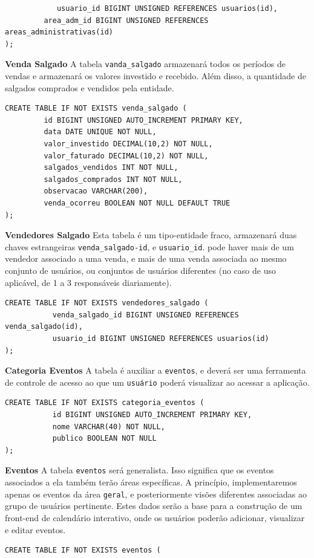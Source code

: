 \documentclass[11pt]{article}
\begin{document}
\begin{enumerate}
\begin{enumerate}
\begin{verbatim}
            usuario_id BIGINT UNSIGNED REFERENCES usuarios(id),
         area_adm_id BIGINT UNSIGNED REFERENCES areas_administrativas(id)
);
\end{verbatim}
\textbf{Venda Salgado}
A tabela \texttt{vanda\_salgado} armazenará todos os períodos de vendas e armazenará os valores investido e recebido. Além disso, a quantidade de salgados comprados e vendidos pela entidade.
\begin{verbatim}
CREATE TABLE IF NOT EXISTS venda_salgado (
         id BIGINT UNSIGNED AUTO_INCREMENT PRIMARY KEY,
         data DATE UNIQUE NOT NULL,
         valor_investido DECIMAL(10,2) NOT NULL,
         valor_faturado DECIMAL(10,2) NOT NULL,
         salgados_vendidos INT NOT NULL,
         salgados_comprados INT NOT NULL,
         observacao VARCHAR(200),
         venda_ocorreu BOOLEAN NOT NULL DEFAULT TRUE
);
\end{verbatim}
\textbf{Vendedores Salgado}
Esta tabela é um tipo-entidade fraco, armazenará duas chaves estrangeiras \texttt{venda\_salgado-id}, e \texttt{usuario\_id}. pode haver mais de um vendedor associado a uma venda, e mais de uma venda associada ao mesmo conjunto de usuários, ou conjuntos de usuários diferentes (no caso de uso aplicável, de 1 a 3 responsáveis diariamente).
\begin{verbatim}
CREATE TABLE IF NOT EXISTS vendedores_salgado (
           venda_salgado_id BIGINT UNSIGNED REFERENCES venda_salgado(id),
           usuario_id BIGINT UNSIGNED REFERENCES usuarios(id)
);
\end{verbatim}
\textbf{Categoria Eventos}
A tabela é auxiliar a \texttt{eventos}, e deverá ser uma ferramenta de controle de acesso ao que um \texttt{usuário} poderá visualizar ao acessar a aplicação.
\begin{verbatim}
CREATE TABLE IF NOT EXISTS categoria_eventos (
           id BIGINT UNSIGNED AUTO_INCREMENT PRIMARY KEY,
           nome VARCHAR(40) NOT NULL,
           publico BOOLEAN NOT NULL
);
\end{verbatim}
\textbf{Eventos}
A tabela \texttt{eventos} será generalista. Isso significa que os eventos associados a ela também terão áreas específicas. A princípio, implementaremos apenas os eventos da área \texttt{geral}, e posteriormente visões diferentes associadas ao grupo de usuários pertinente. Estes dados serão a base para a construção de um front-end de calendário interativo, onde os usuários poderão adicionar, visualizar e editar eventos.
\begin{verbatim}
CREATE TABLE IF NOT EXISTS eventos (

\end{verbatim}
\end{enumerate}
\end{enumerate}
\end{document}
